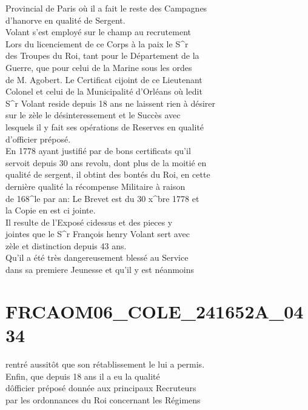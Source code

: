 \documentclass{article}
\begin{document}
\begin{pages}
Provincial de Paris où il a fait le reste des Campagnes\\
d'hanorve en qualité de Sergent.\\
Volant s'est employé sur le champ au recrutement\\
Lors du licenciement de ce Corps à la paix le S\^{}r\\
des Troupes du Roi, tant pour le Département de la\\
Guerre, que pour celui de la Marine sous les ordes\\
de M. Agobert. Le Certificat cijoint de ce Lieutenant\\
Colonel et celui de la Municipalité d'Orléans où ledit\\
S\^{}r Volant reside depuis 18 ans ne laissent rien à désirer\\
sur le zèle le désinteressement et le Succès avec\\
lesquels il y fait ses opérations de Reserves en qualité\\
d'officier préposé.\\
En 1778 ayant justifié par de bons certificats qu'il\\
servoit depuis 30 ans revolu, dont plus de la moitié en\\
qualité de sergent, il obtint des bontés du Roi, en cette\\
dernière qualité la récompense Militaire à raison\\
de 168\^{}le par an: Le Brevet est du 30 x\^{}bre 1778 et\\
la Copie en est ci jointe.\\
Il resulte de l'Exposé cidessus et des pieces y\\
jointes que le S\^{}r François henry Volant sert avec\\
zèle et distinction depuis 43 ans.\\
Qu'il a été très dangereusement blessé au Service\\
dans sa premiere Jeunesse et qu'il y est néanmoins
\pend
\endnumbering\beginnumbering\section{FRCAOM06\_COLE\_241652A\_0434}\pstart
rentré aussitôt que son rétablissement le lui a permis.\\
Enfin, que depuis 18 ans il a eu la qualité\\
dôfficier préposé donnée aux principaux Recruteurs\\
par les ordonnances du Roi concernant les Régimens\\

\end{pages}
\end{document}
